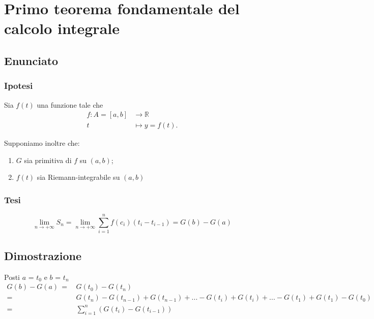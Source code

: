 \documentclass[../dimostrazioni]{subfiles}
\begin{document}
    \chapter{Primo teorema fondamentale del calcolo integrale}
    \label{teoFondCalcoloIntegrale1}

        \section*{Enunciato}

            \subsection*{Ipotesi}

                Sia \(f(t)\) una funzione tale che
                \begin{align*}
                    f : A = [a, b] &\longrightarrow \mathbb{R}\\
                    t &\longmapsto y = f(t).
                \end{align*}

                Supponiamo inoltre che:

                \begin{enumerate}
                    \indentitem \item \(G\) sia primitiva di \(f\) su \((a, b)\);
                    \indentitem \item \(f(t)\) sia Riemann-integrabile su \((a, b)\)
                \end{enumerate}

            \subsection*{Tesi}

                \[\lim_{n\to +\infty} {S_n} = \lim_{n\to +\infty} {\sum_{i=1}^{n} f(c_i)({t_i} - t_{i-1})} = G(b) - G(a) \]

        \section*{Dimostrazione}

                Posti \(a\) = \(t_0\) e \(b\) = \(t_n\)
                \begin{align*}
                    G(b) - G(a) \, =& \, G(t_0) - G(t_n) \\
                    =& \, G(t_n) - G(t_{n-1}) + G(t_{n-1}) + ... - G(t_i) + G(t_i) + ... - G(t_1) + G(t_1) - G(t_0) \\
                    =& \, \sum_{i=1}^n (G(t_i) - G(t_{i-1}))
                \end{align*}
\end{document}
